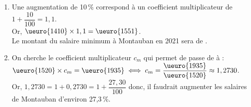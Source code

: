 \begin{enumerate}
\begin{enumerate}
            \item Une augmentation de 10\,\% correspond à un coefficient multiplicateur de $1+\dfrac{10}{100} =1,1$. \\ [1mm]
               Or, $\ueuro{1410}\times1,1 =\ueuro{1551}$. \\
               {\blue Le montant du salaire minimum à Montauban en 2021 sera de }.
            \item On cherche le coefficient multiplicateur $c_m$ qui permet de passe de  à  : \\ [1mm]
                $\ueuro{1520}\times c_m =\ueuro{1935} \iff c_m =\dfrac{\ueuro{1935}}{\ueuro{1520}} \approx1,2730$. \\ [2mm]
                Or, $1,2730 =1+0,2730 =1+\dfrac{27,30}{100}$ donc, {\blue il faudrait augmenter les salaires de Montauban d'environ 27,3\,\%}.
         \end{enumerate}
   \end{enumerate}

